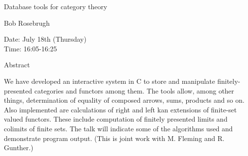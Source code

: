 \begin{center}
\LARGE
Database tools for category theory
\end{center}

\begin{center}
\Large
Bob Rosebrugh
\end{center}

\noindent
Date:  July 18th (Thursday)\\
Time:  16:05-16:25\\

\begin{center}
\large
Abstract
\end{center}

We have developed an interactive system in C to store and manipulate finitely-presented
categories and functors among them. The tools allow, among other things, determination of
equality of composed arrows, sums, products and so on. Also implemented are calculations of right
and left kan extensions of finite-set valued functors. These include computation of finitely
presented limits and colimits of finite sets. The talk will indicate some of the algorithms used and
demonstrate program output. (This is joint work with M. Fleming and R. Gunther.) 

